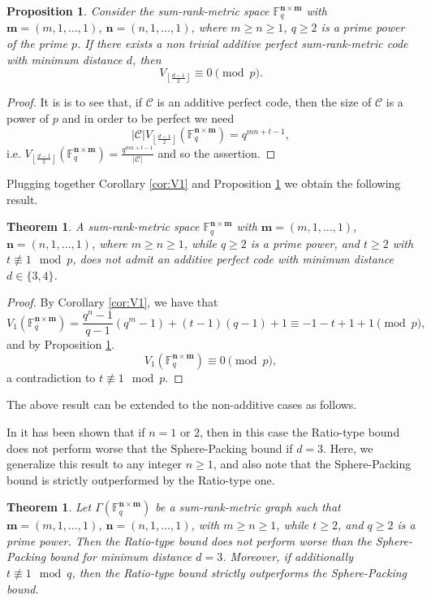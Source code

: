 \documentclass[a4paper]{article}
\newtheorem{proposition}[formula]{Proposition}
\newtheorem{theorem}[formula]{Theorem}
\newcommand{\F}{\mathbb{F}}
\newcommand{\Fq}{\F_q}
\newcommand{\C}{\mathcal{C}}
\newcommand{\bfn}{\mathbf {n}}
\newcommand{\bfm}{\mathbf {m}}
\newcommand{\spac}{\F^{\bfn\times\bfm}_q}
\begin{document}
\begin{proposition}\label{prop:congruence}
    Consider the sum-rank-metric space $\spac$ with $\bfm=(m,1,\dots,1)$, $\bfn=(n,1,\dots,1)$, where $m\geq n\geq1$, $q\geq 2$ is a prime power of the prime $p$. If there exists a non trivial additive perfect sum-rank-metric code with minimum distance $d$, then
    \[ V_{\left\lfloor \frac{d-1}2 \right\rfloor} \equiv 0 \pmod{p}. \]
\end{proposition}
\begin{proof}
    It is is to see that, if $\C$ is an additive perfect code, then the size of $\C$ is a power of $p$ and in order to be perfect we need
    \[ |\mathcal{C}|V_{\left\lfloor \frac{d-1}2 \right\rfloor}(\Fq^{\bfn\times\bfm})=q^{mn+t-1},  \]
    i.e. $V_{\left\lfloor \frac{d-1}2 \right\rfloor}(\Fq^{\bfn\times\bfm})=\frac{q^{mn+t-1}}{|\mathcal{C}|}$ and so the assertion.
\end{proof}

Plugging together Corollary \ref{cor:V1} and Proposition \ref{prop:congruence} we obtain the following result.

\begin{theorem}
    A sum-rank-metric space $\spac$ with $\bfm=(m,1,\dots,1)$, $\bfn=(n,1,\dots,1)$, where $m\geq n\geq1$, while $q\geq 2$ is a prime power, and $t\geq 2$ with $t\not\equiv 1\mod p$, does not admit an additive perfect code with minimum distance $d\in\{3,4\}$.
\end{theorem}
\begin{proof}
    By Corollary \ref{cor:V1}, we have that
    \[ V_1(\Fq^{\bfn\times\bfm})= \frac{q^n-1}{q-1} (q^m-1)+ (t-1)(q-1)+1\equiv -1-t +1+1\pmod{p},\]
    and by Proposition \ref{prop:congruence}.
    \[ V_1(\Fq^{\bfn\times\bfm})\equiv 0 \pmod{p},\] 
    a contradiction to $t\not\equiv 1\mod p$.
\end{proof}

The above result can be extended to the non-additive cases as follows.

In \cite{AKR2024} it has been shown that if $n=1$ or $2$, then in this case the Ratio-type bound does not perform worse that the Sphere-Packing bound if $d=3$. Here, we generalize this result to any integer $n\geq1$, and also note that the Sphere-Packing bound is strictly outperformed by the Ratio-type one.

\begin{theorem}\label{thm:RTSP.oneblock.d=3}
    Let $\Gamma(\spac)$ be a sum-rank-metric graph such that $\bfm=(m,1,\dots,1)$, $\bfn=(n,1,\dots,1)$, with $m\geq n\geq1$, while $t\geq 2$, and $q\geq 2$ is a prime power. Then the Ratio-type bound does not perform worse than the Sphere-Packing bound for minimum distance $d=3$. Moreover, if additionally $t\not\equiv 1\mod q$, then the Ratio-type bound strictly outperforms the Sphere-Packing bound.
\end{theorem}
\end{document}
